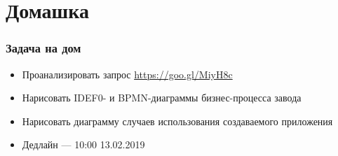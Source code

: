 \documentclass[xetex,mathserif,serif]{beamer}
\begin{document}
	\section{Домашка}

	\begin{frame}
		\frametitle{Задача на дом}
		\begin{itemize}
			\item Проанализировать запрос \url{https://goo.gl/MiyH8c}
			\item Нарисовать IDEF0- и BPMN-диаграммы бизнес-процесса завода
			\item Нарисовать диаграмму случаев использования создаваемого приложения
			\item Дедлайн --- 10:00 13.02.2019
		\end{itemize}
	\end{frame}
\end{document}
